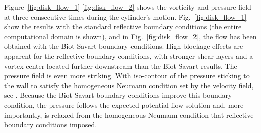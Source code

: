 \documentclass[preprint,12pt]{elsarticle}
\begin{document}
Figure~\ref{fig:disk_flow_1}-\ref{fig:disk_flow_2} shows the vorticity and pressure field at three consecutive times during the cylinder's motion. Fig.~\ref{fig:disk_flow_1} show the results with the standard reflective boundary conditions (the entire computational domain is shown), and in Fig.~\ref{fig:disk_flow_2}, the flow has been obtained with the Biot-Savart boundary conditions. High blockage effects are apparent for the reflective boundary conditions, with stronger shear layers and a vortex center located further downstream than the Biot-Savart results. The pressure field is even more striking. With iso-contour of the pressure sticking to the wall to satisfy the homogeneous Neumann condition set by the velocity field, see \cite{}. Because the Biot-Savart boundary conditions improve this boundary condition, the pressure follows the expected potential flow solution and, more importantly, is relaxed from the homogeneous Neumann condition that reflective boundary conditions imposed.
\end{document}
